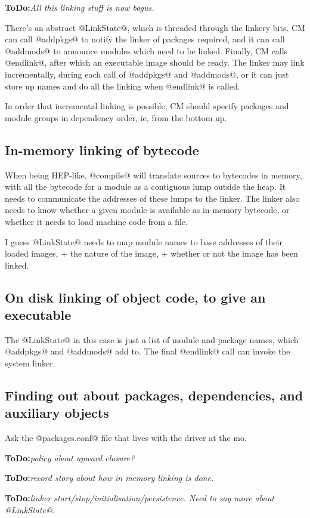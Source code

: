 \documentclass[11pt]{article}
\newcommand{\ToDo}[1]{{{\bf ToDo:}\sl #1}}
\begin{document}
\ToDo{All this linking stuff is now bogus.}

There's an abstract @LinkState@, which is threaded through the linkery
bits.  CM can call @addpkgs@ to notify the linker of packages
required, and it can call @addmods@ to announce modules which need to
be linked.  Finally, CM calls @endlink@, after which an executable
image should be ready.  The linker may link incrementally, during each
call of @addpkgs@ and @addmods@, or it can just store up names and do
all the linking when @endlink@ is called.

In order that incremental linking is possible, CM should specify
packages and module groups in dependency order, ie, from the bottom up.

\subsection*{In-memory linking of bytecode}
When being HEP-like, @compile@ will translate sources to bytecodes
in memory, with all the bytecode for a module as a contiguous lump
outside the heap.  It needs to communicate the addresses of these
lumps to the linker.  The linker also needs to know whether a 
given module is available as in-memory bytecode, or whether it
needs to load machine code from a file.

I guess @LinkState@ needs to map module names to base addresses
of their loaded images, + the nature of the image, + whether or not
the image has been linked.

\subsection*{On disk linking of object code, to give an executable}
The @LinkState@ in this case is just a list of module and package
names, which @addpkgs@ and @addmods@ add to.  The final @endlink@
call can invoke the system linker.

\subsection{Finding out about packages, dependencies, and auxiliary 
            objects}

Ask the @packages.conf@ file that lives with the driver at the mo.

\ToDo{policy about upward closure?}



\ToDo{record story about how in memory linking is done.}

\ToDo{linker start/stop/initialisation/persistence.  Need to
      say more about @LinkState@.}
\end{document}

